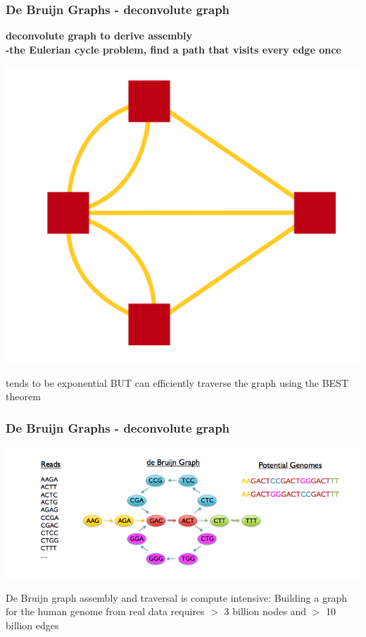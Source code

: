 \documentclass[pdf]{beamer}
\begin{document}
\begin{frame}
\frametitle{De Bruijn Graphs - deconvolute graph}
\textbf{deconvolute graph to derive assembly\\ -the Eulerian cycle problem, find a path that visits every edge once}\\
\begin{center}
\includegraphics[scale=0.2]{Figures/eurler.png} 
\end{center}
tends to be exponential BUT can efficiently traverse the graph using the BEST theorem
\end{frame}

\begin{frame}
\frametitle{De Bruijn Graphs - deconvolute graph}
\begin{center}
\includegraphics[scale=.45]{Figures/eulerreduce.png} 
\end{center}
De Bruijn graph assembly and traversal is compute intensive: Building a graph for the human genome from real data requires $>$ 3 billion nodes and $>$ 10 billion edges
\end{frame}
\end{document}
